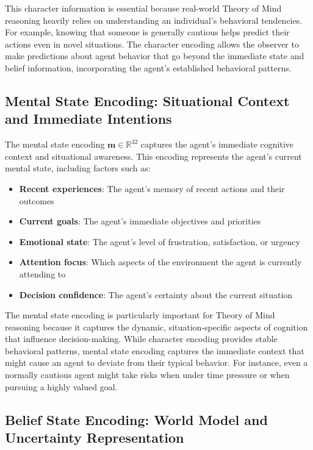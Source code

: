 \documentclass[11pt]{article}
\begin{document}
This character information is essential because real-world Theory of Mind reasoning heavily relies on understanding an individual's behavioral tendencies. For example, knowing that someone is generally cautious helps predict their actions even in novel situations. The character encoding allows the observer to make predictions about agent behavior that go beyond the immediate state and belief information, incorporating the agent's established behavioral patterns.

\subsection{Mental State Encoding: Situational Context and Immediate Intentions}

The mental state encoding $\mathbf{m} \in \mathbb{R}^{32}$ captures the agent's immediate cognitive context and situational awareness. This encoding represents the agent's current mental state, including factors such as:

\begin{itemize}
    \item \textbf{Recent experiences}: The agent's memory of recent actions and their outcomes
    \item \textbf{Current goals}: The agent's immediate objectives and priorities
    \item \textbf{Emotional state}: The agent's level of frustration, satisfaction, or urgency
    \item \textbf{Attention focus}: Which aspects of the environment the agent is currently attending to
    \item \textbf{Decision confidence}: The agent's certainty about the current situation
\end{itemize}

The mental state encoding is particularly important for Theory of Mind reasoning because it captures the dynamic, situation-specific aspects of cognition that influence decision-making. While character encoding provides stable behavioral patterns, mental state encoding captures the immediate context that might cause an agent to deviate from their typical behavior. For instance, even a normally cautious agent might take risks when under time pressure or when pursuing a highly valued goal.

\subsection{Belief State Encoding: World Model and Uncertainty Representation}
\end{document}
